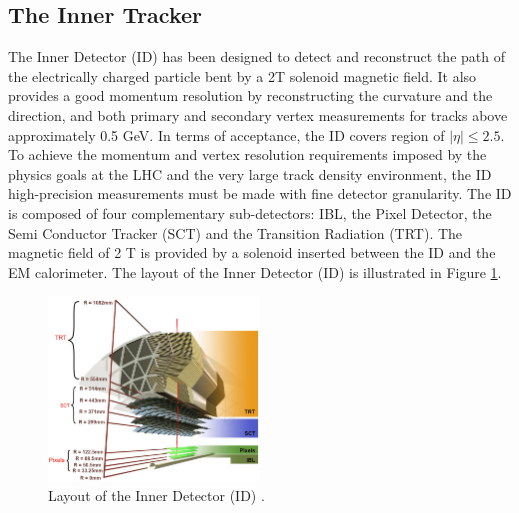 \subsection{The Inner Tracker}
\label{chap2:ATLAS:ITk}
The Inner Detector (ID) has been designed to detect and reconstruct the path of the electrically charged particle bent by a 2T solenoid magnetic field. It also provides a good momentum resolution by reconstructing the curvature and the direction, and both primary and secondary vertex measurements for tracks above approximately 0.5 GeV\cite{ID_TRD, TrkVertexing}. In terms of acceptance, the ID covers region of $|\eta|\leqslant2.5$. To achieve the momentum and vertex resolution requirements imposed by the physics goals at the LHC and the very large track density environment, the ID high-precision measurements must be made with fine detector granularity. The ID is composed of four complementary sub-detectors: IBL, the Pixel Detector, the Semi Conductor Tracker (SCT) and the Transition Radiation (TRT). The magnetic field of 2 T is provided by a solenoid inserted between the ID and the EM calorimeter. The layout of the Inner Detector (ID) is illustrated in Figure \ref{fig:chap2:ATLAS:ITK:ID}.
\begin{figure}[ht]
    \centering
    \includegraphics[width=0.5\textwidth]{Ch2/Img/ID_withIBL.png}
    \caption{Layout of the Inner Detector (ID) \cite{ID_withIBL}.}
    \label{fig:chap2:ATLAS:ITK:ID}
\end{figure}
